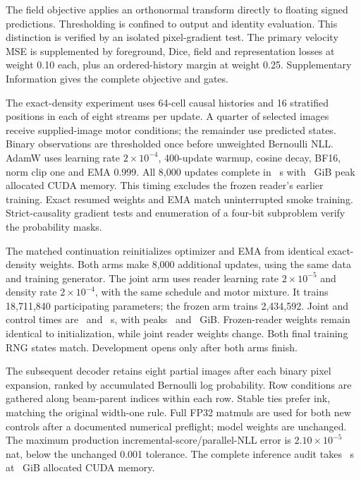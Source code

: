 The field objective applies an orthonormal transform directly to floating
signed predictions. Thresholding is confined to output and identity
evaluation. This distinction is verified by an isolated pixel-gradient test.
The primary velocity MSE is supplemented by foreground, Dice, field and
representation losses at weight 0.10 each, plus an ordered-history margin at
weight 0.25. Supplementary Information gives the complete objective and gates.

The exact-density experiment uses 64-cell causal histories and 16 stratified
positions in each of eight streams per update. A quarter of selected images
receive supplied-image motor conditions; the remainder use predicted states.
Binary observations are thresholded once before unweighted Bernoulli NLL.
AdamW uses learning rate $2\times10^{-4}$, 400-update warmup, cosine decay,
BF16, norm clip one and EMA 0.999. All 8,000 updates complete in
\DensitySeconds\ s with \DensityMemory\ GiB peak allocated CUDA memory.
This timing excludes the frozen reader's earlier training. Exact resumed
weights and EMA match uninterrupted smoke training. Strict-causality gradient
tests and enumeration of a four-bit subproblem verify the probability masks.

The matched continuation reinitializes optimizer and EMA from identical
exact-density weights. Both arms make 8,000 additional updates, using the same
data and training generator. The joint arm uses reader learning rate
$2\times10^{-5}$ and density rate $2\times10^{-4}$, with the same schedule and
motor mixture. It trains 18,711,840 participating parameters; the frozen arm
trains 2,434,592. Joint and control times are \JointTime\ and \ControlTime\ s,
with peaks \JointMemory\ and \ControlMemory\ GiB. Frozen-reader weights remain
identical to initialization, while joint reader weights change. Both final
training RNG states match. Development opens only after both arms finish.

The subsequent decoder retains eight partial images after each binary pixel
expansion, ranked by accumulated Bernoulli log probability. Row conditions are
gathered along beam-parent indices within each row. Stable ties prefer ink,
matching the original width-one rule. Full FP32 matmuls are used for both new
controls after a documented numerical preflight; model weights are unchanged.
The maximum production incremental-score/parallel-NLL error is
$2.10\times10^{-5}$ nat, below the unchanged 0.001 tolerance. The complete
inference audit takes \BeamSeconds\ s at \BeamMemory\ GiB allocated CUDA memory.

